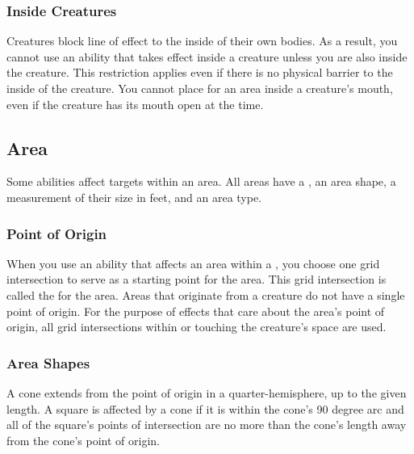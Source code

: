         \subsubsection{Inside Creatures}
            Creatures block line of effect to the inside of their own bodies.
            As a result, you cannot use an ability that takes effect inside a creature unless you are also inside the creature.
            This restriction applies even if there is no physical barrier to the inside of the creature.
            You cannot place  for an area inside a creature's mouth, even if the creature has its mouth open at the time.

    \subsection{Area}\label{Area}

        Some abilities affect targets within an area.
        All areas have a , an area shape, a measurement of their size in feet, and an area type.

        \subsubsection{Point of Origin}\label{Point of Origin}
            When you use an ability that affects an area within a , you choose one grid intersection to serve as a starting point for the area.
            This grid intersection is called the  for the area.
            Areas that originate from a creature do not have a single point of origin.
            For the purpose of effects that care about the area's point of origin, all grid intersections within or touching the creature's space are used.

        \subsubsection{Area Shapes}\label{Area Shapes}

             A cone extends from the point of origin in a quarter-hemisphere, up to the given length.
            A square is affected by a cone if it is within the cone's 90 degree arc and all of the square's points of intersection are no more than the cone's length away from the cone's point of origin.

